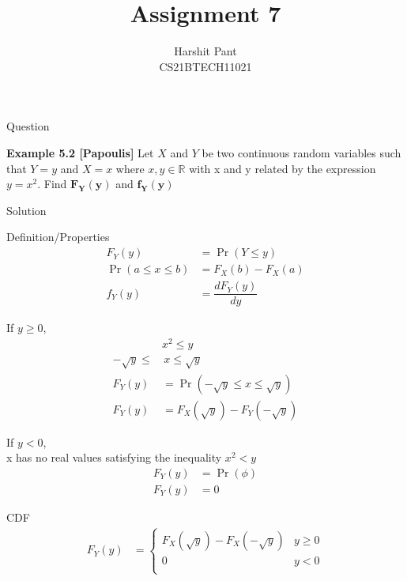 \documentclass{beamer}
\title{Assignment 7}
\author[CS21BTECH11021]{Harshit Pant\\CS21BTECH11021}
\date{}
\providecommand{\pr}[1]{\ensuremath{\Pr\left(#1\right)}}
\begin{document}
\begin{frame}
\titlepage
\end{frame}
\begin{frame}{Question}
\begin{block}{\textbf{Example 5.2 [Papoulis]}}
Let $X$ and $Y$ be two continuous random variables such that $Y=y$ and $X=x$ where $x,y\in\mathbb{R}$ with x and y related by the expression $y=x^2$. Find $\mathbf{F_Y(y)}$ and $\mathbf{f_Y(y)}$
\end{block}
\end{frame}
\begin{frame}{Solution}
\begin{block}{Definition/Properties}
\begin{align}
F_Y(y)&=\pr{Y\leq y}\\
\pr{a\leq x\leq b}&=F_X(b)-F_X(a)\\
f_Y(y)&=\dfrac{dF_Y(y)}{dy}
\end{align}
\end{block}
\begin{block}{}
If $y\geq 0$,
\begin{align}
&x^2\leq y\\
-\sqrt{y}\leq&\,x\leq \sqrt{y}\\
F_Y(y)&=\pr{-\sqrt{y}\leq x\leq \sqrt{y}}\\
F_Y(y)&=F_X(\sqrt{y})-F_Y(-\sqrt{y})
\end{align}
\end{block}
\end{frame}
\begin{frame}
\begin{block}{}
If $y<0$,\\x has no real values satisfying the inequality $x^2<y$
\begingroup
\addtolength{\jot}{.1in} 
\begin{align}
F_Y(y)&=\pr{\phi}\\
F_Y(y)&=0
\end{align}
\endgroup
\end{block}
\begin{exampleblock}{CDF}
\begingroup
\addtolength{\jot}{.1in}
\begin{align}
F_Y(y)&=\begin{cases}
				  F_X(\sqrt{y})-F_X(-\sqrt{y})&y\geq0\\
				  0&y<0\\
				  \end{cases}
\end{align}
\endgroup
\end{exampleblock}
\end{frame}
\end{document}
